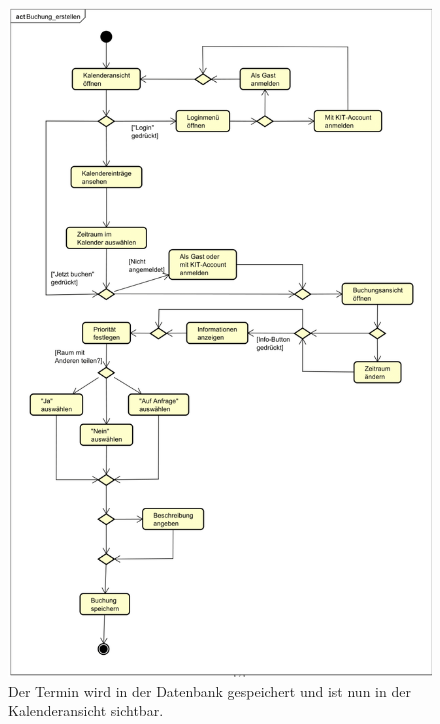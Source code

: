 \documentclass{sdqbeamer}
\begin{document}
\begin{frame}
    \begin{figure}
        \centering
        \includegraphics[width=\textwidth]{pictures/figures/activity/buchungerstellen} %
        \caption{Der Termin wird in der Datenbank gespeichert und ist nun in der Kalenderansicht sichtbar.}
        \label{fig:terminerstellenprozess}
    \end{figure}
\end{frame}

\end{document}
